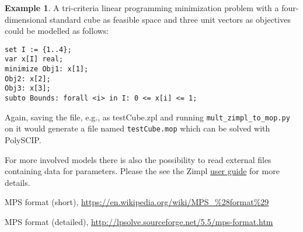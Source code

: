 \documentclass[11pt,listof=totoc]{scrartcl}
\theoremstyle{definition}
\newtheorem{ex}{Example}[section]
\begin{document}
\begin{ex}A tri-criteria linear programming minimization problem with a four-dimensional standard cube as feasible space and three unit vectors as objectives could be modelled as follows:
\begin{verbatim}
set I := {1..4};
var x[I] real;
minimize Obj1: x[1];
Obj2: x[2];
Obj3: x[3];
subto Bounds: forall <i> in I: 0 <= x[i] <= 1;
\end{verbatim}
Again, saving the file, e.g., as testCube.zpl and running \texttt{mult\_zimpl\_to\_mop.py} on it would generate a file named \texttt{testCube.mop} which can be solved with PolySCIP.
\end{ex}

For more involved models there is also the possibility to read
external files containing data for parameters. Please the see the
Zimpl \href{http://zimpl.zib.de/download/zimpl.pdf}{user guide} for
more details.

\begin{thebibliography}{}
 MPS format (short),
  \url{https://en.wikipedia.org/wiki/MPS_%28format%29}

 MPS format (detailed),
  \url{http://lpsolve.sourceforge.net/5.5/mps-format.htm}
\end{thebibliography}
\end{document}

